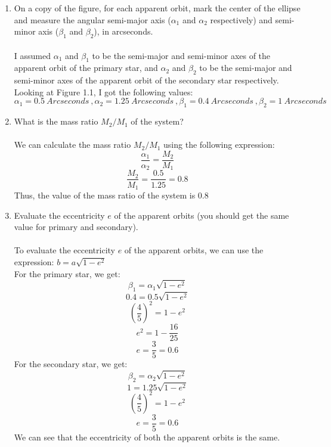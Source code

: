 \documentclass[10pt]{article}
\begin{document}
\begin{enumerate} [label=(\alph*)]

    \item On a copy of the figure, for each apparent orbit, mark the center of the ellipse and measure the angular semi-major axis ($\alpha_{1}$ and $\alpha_{2}$ respectively) and semi-minor axis ($\beta_{1}$ and $\beta_{2}$), in arcseconds. \\ \\
    I assumed $\alpha_{1}$ and $\beta_{1}$ to be the semi-major and semi-minor axes of the apparent orbit of the primary star, and $\alpha_{2}$ and $\beta_{2}$ to be the semi-major and semi-minor axes of the apparent orbit of the secondary star respectively. \\
    Looking at Figure 1.1, I got the following values: \\
    \[ \alpha_{1} = 0.5 \ Arcseconds \ , \alpha_{2} = 1.25  \ Arcseconds \ , \beta_{1} = 0.4  \ Arcseconds \ , \beta_{2} = 1  \ Arcseconds \]
    
    \item What is the mass ratio $M_{2}/M_{1}$ of the system? \\ \\
    We can calculate the mass ratio $M_{2}/M_{1}$ using the following expression:
    \[ \frac{\alpha_{1}}{\alpha_{2}} = \frac{M_{2}}{M_{1}}\]
    \[ \frac{M_{2}}{M_{1}} = \frac{0.5}{1.25} = 0.8\]
    Thus, the value of the mass ratio of the system is 0.8

    \item Evaluate the eccentricity $e$ of the apparent orbits (you should get the same value for primary and secondary). \\ \\
    To evaluate the eccentricity $e$ of the apparent orbits, we can use the expression: $b = a \sqrt{1 - e^{2}}$ \\
    For the primary star, we get:
    \[ \beta_{1} = \alpha_{1} \sqrt{1 - e^{2}}\]
    \[ 0.4 = 0.5 \sqrt{1 - e^{2}}\]
    \[ \left( \frac{4}{5} \right)^{2} = 1 - e^{2} \]
    \[ e^{2} = 1 - \frac{16}{25}\]
    \[ e = \frac{3}{5} = 0.6\]
    For the secondary star, we get:
    \[ \beta_{2} = \alpha_{2} \sqrt{1 - e^{2}}\]
    \[ 1 = 1.25 \sqrt{1 - e^{2}}\]
    \[ \left( \frac{4}{5} \right)^{2} = 1 - e^{2} \]
    \[ e = \frac{3}{5} = 0.6\]
    We can see that the eccentricity of both the apparent orbits is the same.


\end{enumerate}
\end{document}
